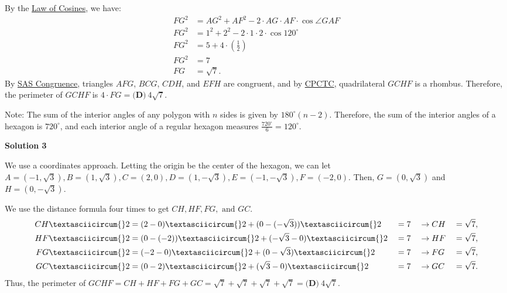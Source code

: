 \begin{enumerate}
 By the \href{https://artofproblemsolving.com/wiki/index.php?title=Law\_of\_Cosines}{Law of Cosines}, we have: 
 \begin{align*} FG^2 &= AG^2 + AF^2 - 2 \cdot AG \cdot AF \cdot \cos \angle GAF \\ FG^2 &= 1^2 + 2^2 - 2 \cdot 1 \cdot 2 \cdot \cos 120 ^{\circ} \\ FG^2 &= 5 + 4 \cdot \left( \frac 12 \right) \\ FG^2 &= 7 \\ FG &= \sqrt 7. \end{align*}
By \href{https://artofproblemsolving.com/wiki/index.php?title=SAS\_Congruence&action=edit&redlink=1}{SAS Congruence}, triangles $AFG$, $BCG$, $CDH$, and $EFH$ are congruent, and by \href{https://artofproblemsolving.com/wiki/index.php?title=CPCTC}{CPCTC}, quadrilateral $GCHF$ is a rhombus. Therefore, the perimeter of $GCHF$ is $4 \cdot FG = \boxed{\textbf{(D)}\ 4\sqrt7}$.

 Note: The sum of the interior angles of any polygon with $n$ sides is given by $180 ^{\circ} (n - 2)$. Therefore, the sum of the interior angles of a hexagon is $720 ^{\circ}$, and each interior angle of a regular hexagon measures $\frac{720 ^{\circ}}{6} = 120 ^{\circ}$.

 



\textbf{Solution 3}

We use a coordinates approach. Letting the origin be the center of the hexagon, we can let $A = (-1, \sqrt{3}), B = (1, \sqrt{3}), C = (2, 0), D = (1, -\sqrt{3}), E = (-1, -\sqrt{3}), F = (-2, 0).$ Then, $G = (0, \sqrt{3})$ and $H = (0, -\sqrt{3}).$

 We use the distance formula four times to get $CH, HF, FG, \text{ and } GC.$
 \begin{alignat*}{8} CH\textasciicircum{}2 &= (2-0)\textasciicircum{}2 + (0-(-\sqrt{3}))\textasciicircum{}2 &&= 7 &&\rightarrow CH &&= \sqrt{7}, \\ HF\textasciicircum{}2 &= (0-(-2))\textasciicircum{}2 + (-\sqrt{3}-0)\textasciicircum{}2 &&= 7 &&\rightarrow HF &&= \sqrt{7}, \\ FG\textasciicircum{}2 &= (-2-0)\textasciicircum{}2 + (0-\sqrt{3})\textasciicircum{}2 &&= 7 &&\rightarrow FG &&= \sqrt{7}, \\ GC\textasciicircum{}2 &= (0-2)\textasciicircum{}2 + (\sqrt{3}-0)\textasciicircum{}2 &&= 7 &&\rightarrow GC &&= \sqrt{7}. \end{alignat*}Thus, the perimeter of $GCHF = CH + HF + FG + GC = \sqrt{7} + \sqrt{7} + \sqrt{7} + \sqrt{7} = \boxed{\textbf{(D)}\ 4\sqrt7}$.


\end{enumerate}

